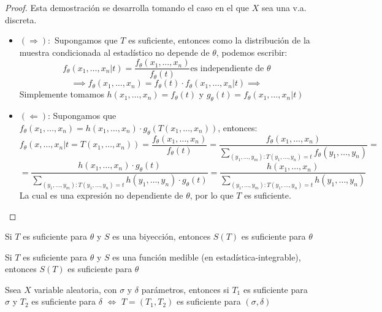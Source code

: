   
\begin{proof}
	Esta demostración se desarrolla tomando el caso en el que $X$ sea una v.a. discreta. 
	\begin{itemize}
		\item $(\Rightarrow):$ Supongamos que $T$ es suficiente, entonces como la distribución de la muestra condicionada al estadístico no depende de $\theta$, podemos escribir:
		      $$ f_{\theta}(x_1, \ldots, x_n | t) = \frac{f_{\theta}(x_1, \ldots, x_n)}{f_{\theta}(t)} \text{es independiente de } \theta$$
		      $$\implies f_{\theta}(x_1, \ldots, x_n) = f_{\theta}(t) \cdot f_{\theta}(x_1, \ldots, x_n | t) \implies$$
		      Simplemente tomamos $h(x_1, \ldots, x_n) = f_{\theta}(t)$ y $g_{\theta}(t) = f_{\theta}(x_1, \ldots, x_n | t)$
		\item $(\Leftarrow)$: Supongamos que $f_{\theta}(x_1, \ldots, x_n) = h(x_1, \ldots, x_n) \cdot g_{\theta}(T(x_1, \ldots, x_n))$, entonces:\\
		      $$ f_{\theta}(x, \ldots, x_n | t = T(x_1, \ldots, x_n)) = \frac{f_{\theta}(x_1, \ldots, x_n)}{f_{\theta}(t)} = \frac{f_{\theta}(x_1, \ldots, x_n)}{\sum_{(y_1, \ldots, y_m) : T(y_1, \ldots, y_n) = t} f_{\theta}(y_1, \ldots, y_n)} = $$ $$ = \frac{h(x_1, \ldots, x_n) \cdot g_{\theta}(t)}{\sum_{(y_1, \ldots, y_m) : T(y_1, \ldots, y_n) = t} h(y_1, \ldots, y_n) \cdot g_{\theta}(t)} = \frac{h(x_1, \ldots, x_n)}{\sum_{(y_1, \ldots, y_m) : T(y_1, \ldots, y_n) = t} h(y_1, \ldots, y_n)}$$ La cual es una expresión no dependiente de $\theta$, por lo que $T$ es suficiente.
	\end{itemize}
\end{proof}

\begin{proposición}
	Si $T$ es suficiente para $\theta$ y $S$ es una biyección, entonces $S(T)$ es suficiente para $\theta$
\end{proposición}

\begin{proposición}
	Si $T$ es suficiente para $\theta$ y $S$ es una función medible (en estadística-integrable), entonces $S(T)$ es suficiente para $\theta$
\end{proposición}

\begin{proposición}
	Ssea $X$ variable aleatoria, con $\sigma$ y $\delta$ parámetros, entonces si $T_1$ es suficiente para $\sigma$ y $T_2$ es suficiente para $\delta$ $\iff$ $T = (T_1, T_2)$ es suficiente para $(\sigma, \delta)$
\end{proposición}

